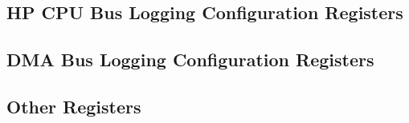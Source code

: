 \documentclass[main\_\_EN.tex]{subfiles}
\begin{document}
\subsection{HP CPU Bus Logging Configuration Registers}
\label{sec:dbgassist-spm-mem-monitor-reg}




\subsection{DMA Bus Logging Configuration Registers}
\label{sec:dbgassist-l2-mem-monitor-reg}




\subsection{Other Registers}
\label{sec:dbgassist-bus-monitor-reg}


\end{document}
